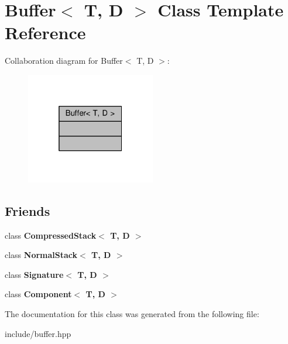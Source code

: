 \hypertarget{class_buffer}{}\section{Buffer$<$ T, D $>$ Class Template Reference}
\label{class_buffer}


Collaboration diagram for Buffer$<$ T, D $>$\+:
\nopagebreak
\begin{figure}[H]
\begin{center}
\leavevmode
\includegraphics[width=160pt]{class_buffer__coll__graph}
\end{center}
\end{figure}
\subsection*{Friends}
\begin{DoxyCompactItemize}
\item 
class {\bfseries Compressed\+Stack$<$ T, D $>$}\hypertarget{class_buffer_a0bc563c952d4b72ba232305ab7717bd9}{}\label{class_buffer_a0bc563c952d4b72ba232305ab7717bd9}

\item 
class {\bfseries Normal\+Stack$<$ T, D $>$}\hypertarget{class_buffer_a3448f5e6d9366f8729b55e62587568ca}{}\label{class_buffer_a3448f5e6d9366f8729b55e62587568ca}

\item 
class {\bfseries Signature$<$ T, D $>$}\hypertarget{class_buffer_a3bdacd57a94b060eb49095b91e06e01e}{}\label{class_buffer_a3bdacd57a94b060eb49095b91e06e01e}

\item 
class {\bfseries Component$<$ T, D $>$}\hypertarget{class_buffer_a843c2f068a1ab99ce6c9c0e2cc3946c5}{}\label{class_buffer_a843c2f068a1ab99ce6c9c0e2cc3946c5}

\end{DoxyCompactItemize}


The documentation for this class was generated from the following file\+:\begin{DoxyCompactItemize}
\item 
include/buffer.\+hpp\end{DoxyCompactItemize}
